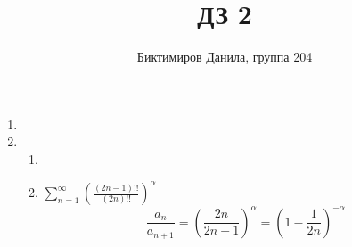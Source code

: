 \documentclass[11pt]{article}
\begin{document}
	
	\author{Биктимиров Данила, группа 204}
	\title{ДЗ 2}
	\date{}
	\maketitle
	
	\medskip
	
	\begin{enumerate}
		
		\item 
		
		\item \begin{enumerate}
			\item
			 
			\item $\sum_{n=1}^{\infty}\left(\frac{(2n-1)!!}{(2n)!!}\right)^\alpha$
			$$\frac{a_n}{a_{n+1}}=\left(\frac{2n}{2n-1}\right)^\alpha=\left(1-\frac{1}{2n}\right)^{-\alpha}$$
		\end{enumerate}
		
	\end{enumerate}
\end{document}
